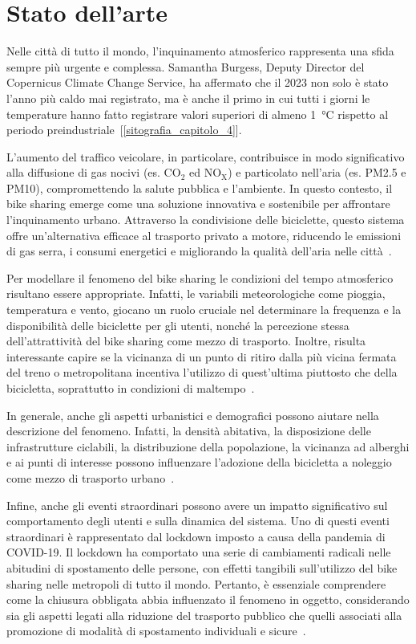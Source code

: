 \section[Stato dell'arte]{Stato dell'arte}
Nelle città di tutto il mondo, l'inquinamento atmosferico rappresenta una sfida sempre più urgente e complessa. Samantha Burgess, Deputy Director del Copernicus Climate Change Service, ha affermato che il 2023 non solo è stato l'anno più caldo mai registrato, ma è anche il primo in cui tutti i giorni le temperature hanno fatto registrare valori superiori di almeno \SI{1}{\degreeCelsius} rispetto al periodo preindustriale~[\ref{sitografia_capitolo_4}].
\par L'aumento del traffico veicolare, in particolare, contribuisce in modo significativo alla diffusione di gas nocivi (es. CO$_2$ ed NO$_\text{X}$) e particolato nell'aria (es. PM\num{2.5} e PM\num{10}), compromettendo la salute pubblica e l'ambiente. In questo contesto, il bike sharing emerge come una soluzione innovativa e sostenibile per affrontare l'inquinamento urbano. Attraverso la condivisione delle biciclette, questo sistema offre un'alternativa efficace al trasporto privato a motore, riducendo le emissioni di gas serra, i consumi energetici e migliorando la qualità dell'aria nelle città~\citep{paper_bike_sharing_e_ambiente}.
\par Per modellare il fenomeno del bike sharing le condizioni del tempo atmosferico risultano essere appropriate. Infatti, le variabili meteorologiche come pioggia, temperatura e vento, giocano un ruolo cruciale nel determinare la frequenza e la disponibilità delle biciclette per gli utenti, nonché la percezione stessa dell'attrattività del bike sharing come mezzo di trasporto. Inoltre, risulta interessante capire se la vicinanza di un punto di ritiro dalla più vicina fermata del treno o metropolitana incentiva l'utilizzo di quest'ultima piuttosto che della bicicletta, soprattutto in condizioni di maltempo~\citep{paper_bike_sharing_e_meteo}.
\par In generale, anche gli aspetti urbanistici e demografici possono aiutare nella descrizione del fenomeno. Infatti, la densità abitativa, la disposizione delle infrastrutture ciclabili, la distribuzione della popolazione, la vicinanza ad alberghi e ai punti di interesse possono influenzare l'adozione della bicicletta a noleggio come mezzo di trasporto urbano~\citep{paper_bike_sharing_e_popolazione}.
\par Infine, anche gli eventi straordinari possono avere un impatto significativo sul comportamento degli utenti e sulla dinamica del sistema. Uno di questi eventi straordinari è rappresentato dal lockdown imposto a causa della pandemia di COVID-\num{19}. Il lockdown ha comportato una serie di cambiamenti radicali nelle abitudini di spostamento delle persone, con effetti tangibili sull'utilizzo del bike sharing nelle metropoli di tutto il mondo. Pertanto, è essenziale comprendere come la chiusura obbligata abbia influenzato il fenomeno in oggetto, considerando sia gli aspetti legati alla riduzione del trasporto pubblico che quelli associati alla promozione di modalità di spostamento individuali e sicure~\citep{paper_bike_sharing_e_covid}.
